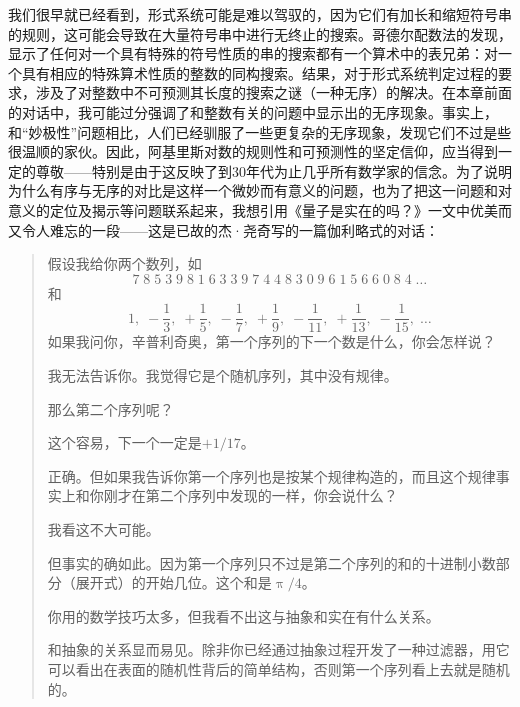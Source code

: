 我们很早就已经看到，形式系统可能是难以驾驭的，因为它们有加长和缩短符号串的规则，这可能会导致在大量符号串中进行无终止的搜索。哥德尔配数法的发现，显示了任何对一个具有特殊的符号性质的串的搜索都有一个算术中的表兄弟：对一个具有相应的特殊算术性质的整数的同构搜索。结果，对于形式系统判定过程的要求，涉及了对整数中不可预测其长度的搜索之谜（一种无序）的解决。在本章前面的对话中，我可能过分强调了和整数有关的问题中显示出的无序现象。事实上，和“妙极性”问题相比，人们已经驯服了一些更复杂的无序现象，发现它们不过是些很温顺的家伙。因此，阿基里斯对数的规则性和可预测性的坚定信仰，应当得到一定的尊敬——特别是由于这反映了到30年代为止几乎所有数学家的信念。为了说明为什么有序与无序的对比是这样一个微妙而有意义的问题，也为了把这一问题和对意义的定位及揭示等问题联系起来，我想引用《量子是实在的吗？》一文中优美而又令人难忘的一段——这是已故的杰·尧奇写的一篇伽利略式的对话：
\begin{quote}
\begin{description}[wide,labelsep=\ccwd,format=\sffamily\itemcolon]
\item[萨尔维亚蒂]假设我给你两个数列，如
\[
7\;8\;5\;3\;9\;8\;1\;6\;3\;3\;9\;7\;4\;4\;8\;3\;0\;9\;
6\;1\;5\;6\;6\;0\; 8\;4\;\dotsc
\]
和
\[
1,\;-\frac13,\;+\frac15,\;-\frac17,\;+\frac19,\;
-\frac1{11},\;+\frac1{13},\;-\frac1{15},\;\dotsc
\]
如果我问你，辛普利奇奥，第一个序列的下一个数是什么，你会怎样说？

\item[辛普利奇奥]我无法告诉你。我觉得它是个随机序列，其中没有规律。

\item[萨尔维亚蒂]那么第二个序列呢？

\item[辛普利奇奥]这个容易，下一个一定是$+1/17$。

\item[萨尔维亚蒂]正确。但如果我告诉你第一个序列也是按某个规律构造的，而且这个规律事实上和你刚才在第二个序列中发现的一样，你会说什么？

\item[辛普利奇奥]我看这不大可能。

\item[萨尔维亚蒂]但事实的确如此。因为第一个序列只不过是第二个序列的和的十进制小数部分（展开式）的开始几位。这个和是$\uppi/4$。

\item[辛普利奇奥]你用的数学技巧太多，但我看不出这与抽象和实在有什么关系。

\item[萨尔维亚蒂]和抽象的关系显而易见。除非你已经通过抽象过程开发了一种过滤器，用它可以看出在表面的随机性背后的简单结构，否则第一个序列看上去就是随机的。


\end{description}
\end{quote}
